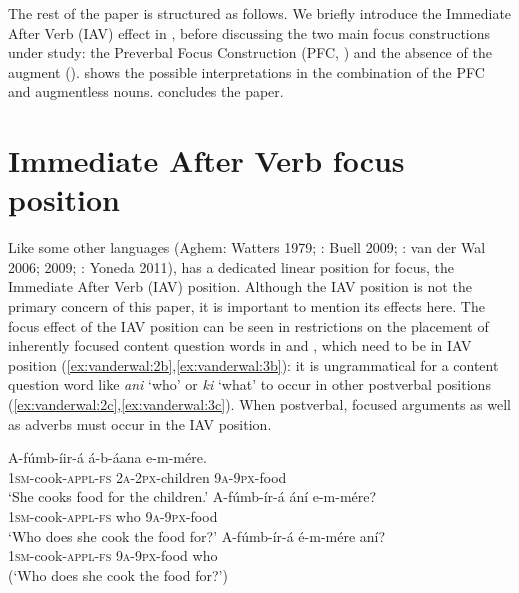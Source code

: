 \documentclass[output=paper]{langsci/langscibook}
\begin{document}
The rest of the paper is structured as follows. We briefly introduce the Immediate After Verb (IAV) effect in , before discussing the two main focus constructions under study: the Preverbal Focus Construction (PFC, ) and the absence of the augment ().  shows the possible interpretations in the combination of the PFC and augmentless nouns.  concludes the paper.

 \section{Immediate After Verb focus position}\label{sec:vanderwal:2}

Like some other  languages (Aghem: Watters 1979; : Buell 2009; : van der Wal 2006; 2009; : Yoneda 2011),  has a dedicated linear position for focus, the Immediate After Verb (IAV) position. Although the IAV position is not the primary concern of this paper, it is important to mention its effects here. The focus effect of the IAV position can be seen in restrictions on the placement of inherently focused content question words in  and , which need to be in IAV position (\ref{ex:vanderwal:2b},\ref{ex:vanderwal:3b}): it is ungrammatical for a content question word like \textit{ani} ‘who’ or \textit{ki} ‘what’ to occur in other postverbal positions (\ref{ex:vanderwal:2c},\ref{ex:vanderwal:3c}). When postverbal, focused arguments as well as adverbs must occur in the IAV position.

\ea\label{ex:vanderwal:2}
\ea\label{ex:vanderwal:2a}
\gll   A-fúmb-íir-á    á-b-áana    e-m-mére.\\
       \textsc{1sm}-cook-\textsc{appl}-\textsc{fs}  \textsc{2a}-\textsc{2px}-children  \textsc{9a}-\textsc{9px}-food\\
\glt   ‘She cooks food for the children.’
\ex\label{ex:vanderwal:2b}
\gll   A-fúmb-ír-á    ání  e-m-mére?\\
       \textsc{1sm}-cook-\textsc{appl}-\textsc{fs}  who  \textsc{9a}-\textsc{9px}-food\\
\glt   ‘Who does she cook the food for?’
\ex\label{ex:vanderwal:2c}
\gll   *A-fúmb-ír-á  é-m-mére   aní?\\
       \textsc{1sm}-cook-\textsc{appl}-\textsc{fs}  \textsc{9a-9px}-food  who\\
\glt   (‘Who does she cook the food for?’)
\z
\z
\end{document}

